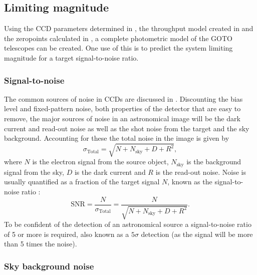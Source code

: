 \begin{colsection}
\newpage
\subsection{Limiting magnitude}
\label{sec:lim_mag}
\begin{colsection}

Using the CCD parameters determined in , the throughput model created in  and the zeropoints calculated in , a complete photometric model of the GOTO telescopes can be created. One use of this is to predict the system limiting magnitude for a target signal-to-noise ratio.

\subsubsection{Signal-to-noise}

The common sources of noise in CCDs are discussed in . Discounting the bias level and fixed-pattern noise, both properties of the detector that are easy to remove, the major sources of noise in an astronomical image will be the dark current and read-out noise as well as the shot noise from the target and the sky background. Accounting for these the total noise in the image is given by
%
\begin{equation}
    \sigma_\text{Total} = \sqrt{N + N_\text{sky} + D + R^2},
    \label{eq:total_noise}
\end{equation}
%
where $N$ is the electron signal from the source object, $N_\text{sky}$ is the background signal from the sky, $D$ is the dark current and $R$ is the read-out noise. Noise is usually quantified as a fraction of the target signal $N$, known as the signal-to-noise ratio :
%
\begin{equation}
    \text{SNR} = \frac{N}{\sigma_\text{Total}} = \frac{N}{\sqrt{N + N_\text{sky} + D + R^2}}.
    \label{eq:snr}
\end{equation}
%
To be confident of the detection of an astronomical source a signal-to-noise ratio of 5 or more is required, also known as a $5\sigma$ detection (as the signal will be more than 5 times the noise).

\newpage

\subsubsection{Sky background noise}


\end{colsection}
\end{colsection}
